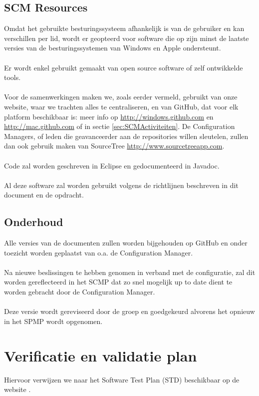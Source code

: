 \subsection{SCM Resources}
Omdat het gebruikte besturingssysteem afhankelijk is van de gebruiker en kan verschillen per lid, wordt er geopteerd voor software die op zijn minst de laatste versies van de besturingssystemen van Windows en Apple ondersteunt.
\\
\\
Er wordt enkel gebruikt gemaakt van open source software of zelf ontwikkelde tools.
\\
\\
Voor de samenwerkingen maken we, zoals eerder vermeld, gebruikt van onze website, waar we trachten alles te centraliseren, en van GitHub, dat voor elk platform beschikbaar is: meer info op \url{http://windows.github.com} en \url{http://mac.github.com} of in sectie \ref{sec:SCMActiviteiten}. De Configuration Managers, of leden die geavanceerder aan de repositories willen sleutelen, zullen dan ook gebruik maken van SourceTree \url{http://www.sourcetreeapp.com}.
\\
\\
Code zal worden geschreven in Eclipse\cite{Eclipse} en gedocumenteerd in Javadoc\cite{Javadoc}.
\\
\\
Al deze software zal worden gebruikt volgens de richtlijnen beschreven in dit document en de opdracht.

\subsection{Onderhoud}
Alle versies van de documenten zullen worden bijgehouden op GitHub en onder toezicht worden geplaatst van o.a. de Configuration Manager.
\\
\\
Na nieuwe beslissingen te hebben genomen in verband met de configuratie, zal dit worden gereflecteerd in het SCMP dat zo snel mogelijk up to date dient te worden gebracht door de Configuration Manager.
\\
\\
Deze versie wordt gereviseerd door de groep en goedgekeurd alvorens het opnieuw in het SPMP wordt opgenomen.

\section{Verificatie en validatie plan}
Hiervoor verwijzen we naar het Software Test Plan (STD) beschikbaar op de website \cite{portalWebsite}.

